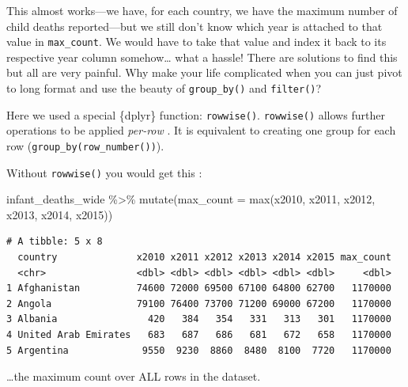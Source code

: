\documentclass[
  letterpaper,
  DIV=11,
  numbers=noendperiod]{scrreprt}
\newenvironment{Shaded}{\begin{snugshade}}{\end{snugshade}}
\newcommand{\AttributeTok}[1]{\textcolor[rgb]{0.40,0.45,0.13}{#1}}
\newcommand{\FunctionTok}[1]{\textcolor[rgb]{0.28,0.35,0.67}{#1}}
\newcommand{\NormalTok}[1]{\textcolor[rgb]{0.00,0.23,0.31}{#1}}
\newcommand{\SpecialCharTok}[1]{\textcolor[rgb]{0.37,0.37,0.37}{#1}}
\begin{document}
This almost works---we have, for each country, we have the maximum
number of child deaths reported---but we still don't know which year is
attached to that value in \texttt{max\_count}. We would have to take
that value and index it back to its respective year column
somehow\ldots{} what a hassle! There are solutions to find this but all
are very painful. Why make your life complicated when you can just pivot
to long format and use the beauty of \texttt{group\_by()} and
\texttt{filter()}?

\begin{tcolorbox}[enhanced jigsaw, colframe=quarto-callout-note-color-frame, rightrule=.15mm, opacityback=0, breakable, coltitle=black, colbacktitle=quarto-callout-note-color!10!white, bottomrule=.15mm, leftrule=.75mm, toprule=.15mm, arc=.35mm, bottomtitle=1mm, colback=white, left=2mm, opacitybacktitle=0.6, titlerule=0mm, title=\textcolor{quarto-callout-note-color}{\faInfo}\hspace{0.5em}{Side Note}, toptitle=1mm]

Here we used a special \{dplyr\} function: \texttt{rowwise()}.
\texttt{rowwise()} allows further operations to be applied
\emph{per-row} . It is equivalent to creating one group for each row
(\texttt{group\_by(row\_number())}).

Without \texttt{rowwise()} you would get this :

\begin{Shaded}
\begin{Highlighting}[]
\NormalTok{infant\_deaths\_wide }\SpecialCharTok{\%\textgreater{}\%} 
  \FunctionTok{mutate}\NormalTok{(}\AttributeTok{max\_count =} \FunctionTok{max}\NormalTok{(x2010, x2011, x2012, x2013, x2014, x2015))}
\end{Highlighting}
\end{Shaded}

\begin{verbatim}
# A tibble: 5 x 8
  country              x2010 x2011 x2012 x2013 x2014 x2015 max_count
  <chr>                <dbl> <dbl> <dbl> <dbl> <dbl> <dbl>     <dbl>
1 Afghanistan          74600 72000 69500 67100 64800 62700   1170000
2 Angola               79100 76400 73700 71200 69000 67200   1170000
3 Albania                420   384   354   331   313   301   1170000
4 United Arab Emirates   683   687   686   681   672   658   1170000
5 Argentina             9550  9230  8860  8480  8100  7720   1170000
\end{verbatim}

\ldots the maximum count over ALL rows in the dataset.

\end{tcolorbox}
\end{document}
